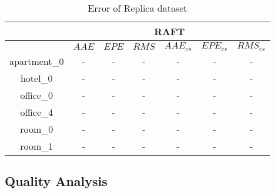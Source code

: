 \begin{table}[h!]
\begin{tabular}{ c | c | c | c | c | c | c }
		& \multicolumn{6}{c}{RAFT} \\
		\hline
		& ${AAE}$ & ${EPE}$ & ${RMS}$ & ${AAE_{cs}}$ & ${EPE_{cs}}$ & ${RMS_{cs}}$ \\
		\hline
		apartment\_0 & - & - & -  & - & - & -  \\ 
		\hline
		hotel\_0 & - & - & -  & - & - & -  \\ 
		\hline
		office\_0 & - & - & - & - & - & -  \\ 
		\hline
		office\_4 & - & - & -  & - & - & -  \\ 
		\hline
		room\_0 & - & - & - & - & - & -  \\ 
		\hline
		room\_1 & - & - & -  & - & - & -  \\ 
		\hline
	\end{tabular}
	\caption{Error of Replica dataset}
	\label{fig:exp:quality}
\end{table}





\subsection{Quality Analysis}





